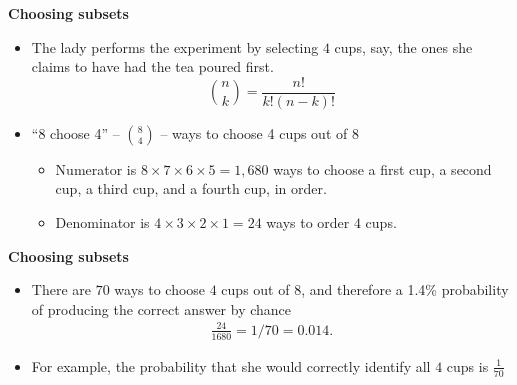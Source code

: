 \documentclass[notes=show]{beamer}
\begin{document}
\begin{frame}[plain]

	\begin{center}
	\textbf{Choosing subsets}
	\end{center}
	
	\begin{itemize}
	\item The lady performs the experiment by selecting $4$ cups, say, the ones she claims to have had the tea poured first.
	 $${n \choose k} = \frac{n!}{k!(n-k)!}$$
	\item ``8 choose 4'' -- $ 8 \choose 4 $ -- ways to choose 4 cups out of 8
		
		\begin{itemize}
		\item Numerator is $8\times{7}\times{6}\times{5}=1,680$ ways to choose a first cup, a second cup, a third cup, and a fourth cup, in order.
		\item Denominator is $4\times{3}\times{2}\times{1}=24$ ways to order $4$ cups.
		\end{itemize}
	\end{itemize}
\end{frame}


\begin{frame}[plain]

\begin{center}
\textbf{Choosing subsets}
\end{center}

\begin{itemize}
	\item There are $70$ ways to choose $4$ cups out of $8$, and therefore a 1.4\% probability of producing the correct answer by chance
		\begin{eqnarray*}
		\frac{24}{1680}=1/70=0.014.
		\end{eqnarray*}
	\item For example, the probability that she would correctly identify all $4$ cups is $\frac{1}{70}$ 
\end{itemize}

\end{frame}



	
\end{document}
